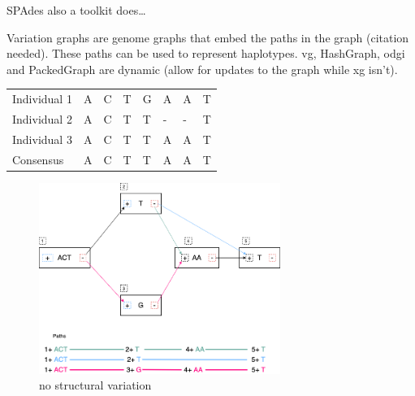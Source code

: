 \documentclass[a4paper]{article}
\begin{document}
SPAdes also a toolkit does…

\newpage
Variation graphs are genome graphs that embed the paths in the graph 
(citation needed).
These paths can be used to represent haplotypes. vg, HashGraph, odgi and
PackedGraph are dynamic (allow for updates to the graph while xg isn’t).


\begin{center}
\begin{tabular}{llllllll}
\color{mypink}Individual 1 & \color{mypink} A & \color{mypink} C & \color{mypink} T & \color{mypink} G & \color{mypink} A & \color{mypink} A & \color{mypink} T\\
\color{myblue}Individual 2 & \color{myblue} A & \color{myblue} C & \color{myblue} T & \color{myblue} T & \color{myblue} - & \color{myblue} - & \color{myblue} T\\
\color{mygreen}Individual 3 & \color{mygreen} A & \color{mygreen} C & \color{mygreen} T & \color{mygreen} T & \color{mygreen} A & \color{mygreen} A & \color{mygreen} T\\
\hline
\color{red}Consensus & \color{red} A & \color{red} C & \color{red} T & \color{red} T & \color{red} A & \color{myred} A & \color{red} T\\
\end{tabular}
\end{center}

\begin{figure}[H]
\centering
\includegraphics[width=0.7\textwidth]{figures/Variation Graph-Page-1.png}
\caption{no structural variation}\label{no struct}
\end{figure}
\end{document}

